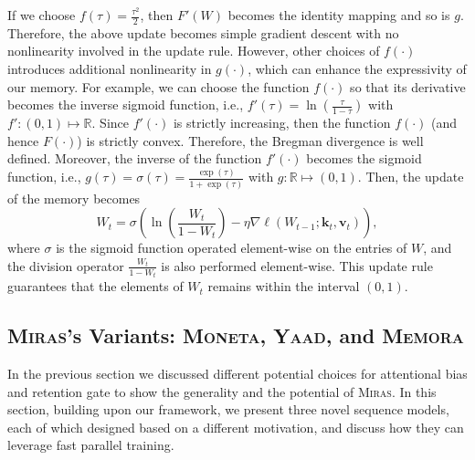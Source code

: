 \documentclass{article}
\newcommand{\framework}[0]{\textsc{Miras}}
\newcommand{\ymodel}[0]{\textsc{Yaad}}
\newcommand{\mmodel}[0]{\textsc{Moneta}}
\newcommand{\xmodel}[0]{\textsc{Memora}}
\newcommand{\vk}[0]{\mathbf{k}}
\newcommand{\vvv}[0]{\mathbf{v}}
\theoremstyle{plain}
\theoremstyle{definition}
\theoremstyle{remark}
\begin{document}
If we choose $f(\tau) = \frac{\tau^2}{2}$, then $F'(W)$ becomes the identity mapping and so is $g$. Therefore, the above update becomes simple gradient descent with no nonlinearity involved in the update rule. However, other choices of $f(\cdot)$ introduces additional nonlinearity in $g(\cdot)$, which can enhance the expressivity of our memory. For example, we can choose the function $f(\cdot)$ so that its derivative becomes the inverse sigmoid function, i.e., $f'(\tau) = \ln\left(\frac{\tau}{1-\tau}\right)$ with $f':(0,1)\mapsto\mathbb{R}$. Since $f'(\cdot)$ is strictly increasing, then the function $f(\cdot)$ (and hence $F(\cdot)$) is strictly convex. Therefore, the Bregman divergence is well defined. Moreover, the inverse of the function $f'(\cdot)$ becomes the sigmoid function, i.e., $g(\tau) = \sigma(\tau) = \frac{\exp(\tau)}{1+\exp(\tau)}$ with $g:\mathbb{R}\mapsto (0,1)$. Then, the update of the memory becomes
\[
 W_t = \sigma\left( \ln \left(\frac{W_t}{1-W_t}\right)-\eta \nabla \ell(W_{t-1};\vk_t, \vvv_t) \right),
\]
where $\sigma$ is the sigmoid function operated element-wise on the entries of $W$, and the division operator $\frac{W_t}{1-W_t}$ is also performed element-wise. This update rule guarantees that the elements of $W_t$ remains within the interval $(0,1)$.





\subsection{\framework's Variants: \mmodel, \ymodel, and \xmodel}\label{sec:Miras-variants}
In the previous section we discussed different potential choices for attentional bias and retention gate to show the generality and the potential of \framework. In this section, building upon our framework, we present three novel sequence models, each of which designed based on a different motivation, and discuss how they can leverage fast parallel training. 
\end{document}
